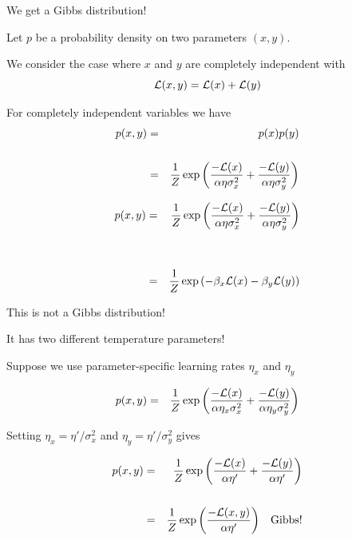 {\vfill
We get a Gibbs distribution!


Let $p$ be a probability density on two parameters $(x,y)$.

\vfill
We consider the case where $x$ and $y$ are completely independent with
$${\cal L}(x,y) = {\cal L}(x) + {\cal L}(y)$$

\vfill
For completely independent variables we have
\begin{eqnarray*}
p(x,y) & = & p(x)p(y) \\
\\
&= & \frac{1}{Z} \exp\left(\frac{-{\cal L}(x)}{\alpha \eta \sigma_x^2} + \frac{-{\cal L}(y)}{\alpha \eta \sigma_y^2}\right)
\end{eqnarray*}


\begin{eqnarray*}
p(x,y) & = & \frac{1}{Z} \exp\left(\frac{-{\cal L}(x)}{\alpha \eta \sigma_x^2} + \frac{-{\cal L}(y)}{\alpha \eta \sigma_y^2}\right) \\
\\
\\
& = & \frac{1}{Z} \exp\left(-\beta_x{\cal L}(x) - \beta_y{\cal L}(y)\right)
\end{eqnarray*}

\vfill
This is not a Gibbs distribution!

\vfill
It has two different temperature parameters!


Suppose we use parameter-specific learning rates $\eta_x$ and $\eta_y$

\begin{eqnarray*}
p(x,y) & = & \frac{1}{Z} \exp\left(\frac{-{\cal L}(x)}{\alpha \eta_x \sigma_x^2} + \frac{-{\cal L}(y)}{\alpha \eta_y \sigma_y^2}\right)
\end{eqnarray*}

Setting $\eta_x = \eta'/\sigma^2_x$ and $\eta_y = \eta'/\sigma^2_y$ gives

\begin{eqnarray*}
p(x,y) & = & \frac{1}{Z} \exp\left(\frac{-{\cal L}(x)}{\alpha \eta'} + \frac{-{\cal L}(y)}{\alpha \eta'}\right) \\
\\
& = & \frac{1}{Z} \exp\left(\frac{-{\cal L}(x,y)}{\alpha \eta'}\right)\;\;\;\mathrm{Gibbs!}
\end{eqnarray*}

}
